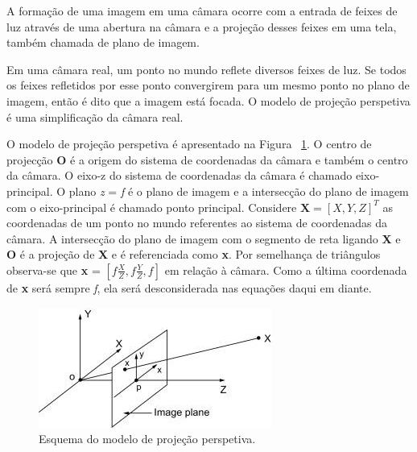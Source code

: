 A formação de uma imagem em uma câmara ocorre com a entrada de feixes de luz através de uma abertura na câmara e a projeção desses feixes em uma tela, também chamada de plano de imagem.

Em uma câmara real, um ponto no mundo reflete diversos feixes de luz. Se todos os feixes refletidos por esse ponto convergirem para um mesmo ponto no plano de imagem, então é dito que a imagem está focada. O modelo de projeção perspetiva é uma simplificação da câmara real.

O modelo de projeção perspetiva é apresentado na Figura ~\ref{fig:modelcamera}. O centro de projecção \textbf{O} é a origem do sistema de coordenadas da câmara e também o centro da câmara. O eixo-z do sistema de coordenadas da câmara é chamado eixo-principal. O plano \textit{z} = \textit{f} é o plano de imagem e a intersecção do plano de imagem com o eixo-principal é chamado ponto principal. Considere $\textbf{X} = [X,Y,Z]^T$ as coordenadas de um ponto no mundo referentes ao sistema de coordenadas da câmara. A intersecção do plano de imagem com o segmento de reta ligando \textbf{X} e \textbf{O} é a projeção de \textbf{X} e é referenciada como \textbf{x}. Por semelhança de triângulos observa-se que \textbf{x} = $[\textit{f} \frac{X}{Z}, \textit{f} \frac{Y}{Z}, \textit{f}]$ em relação à câmara. Como a última coordenada de \textbf{x} será sempre \textit{f}, ela será desconsiderada nas equações daqui em diante.

\begin{figure}[h!]  %
	\centering
	\includegraphics[width=0.6\linewidth]{figures/pinholemodel} 
	\caption{Esquema do modelo de projeção perspetiva. \cite{Yousif2015}}
	\label{fig:modelcamera}  %
\end{figure}

